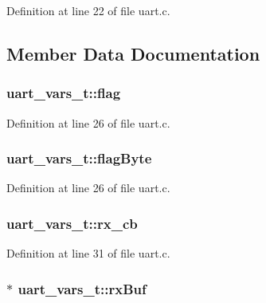 Definition at line 22 of file uart.\+c.



\subsection{Member Data Documentation}
\subsubsection[{\texorpdfstring{flag}{flag}}]{ uart\+\_\+vars\+\_\+t\+::flag}\hypertarget{structuart__vars__t_aee6209e9eed22e14fa14e3a4be9a1009}{}\label{structuart__vars__t_aee6209e9eed22e14fa14e3a4be9a1009}


Definition at line 26 of file uart.\+c.

\subsubsection[{\texorpdfstring{flag\+Byte}{flagByte}}]{ uart\+\_\+vars\+\_\+t\+::flag\+Byte}\hypertarget{structuart__vars__t_a746aeb8ba921915eeb7c497ec2bc9d86}{}\label{structuart__vars__t_a746aeb8ba921915eeb7c497ec2bc9d86}


Definition at line 26 of file uart.\+c.

\subsubsection[{\texorpdfstring{rx\+\_\+cb}{rx_cb}}]{ uart\+\_\+vars\+\_\+t\+::rx\+\_\+cb}\hypertarget{structuart__vars__t_a2f1bc9bb67cf1049bb3da08813dce50a}{}\label{structuart__vars__t_a2f1bc9bb67cf1049bb3da08813dce50a}


Definition at line 31 of file uart.\+c.

\subsubsection[{\texorpdfstring{rx\+Buf}{rxBuf}}]{$\ast$ uart\+\_\+vars\+\_\+t\+::rx\+Buf}\hypertarget{structuart__vars__t_ab81c342109d030db90738127a606e203}{}\label{structuart__vars__t_ab81c342109d030db90738127a606e203}



